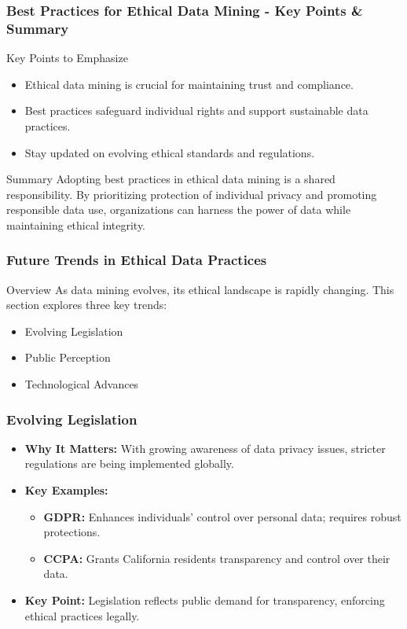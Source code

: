 \documentclass[aspectratio=169]{beamer}
\begin{document}
\begin{frame}[fragile]
    \frametitle{Best Practices for Ethical Data Mining - Key Points & Summary}
    \begin{block}{Key Points to Emphasize}
        \begin{itemize}
            \item Ethical data mining is crucial for maintaining trust and compliance.
            \item Best practices safeguard individual rights and support sustainable data practices.
            \item Stay updated on evolving ethical standards and regulations.
        \end{itemize}
    \end{block}

    \vspace{0.5cm}
    
    \begin{block}{Summary}
        Adopting best practices in ethical data mining is a shared responsibility. By prioritizing protection of individual privacy and promoting responsible data use, organizations can harness the power of data while maintaining ethical integrity.
    \end{block}
\end{frame}

\begin{frame}[fragile]
    \frametitle{Future Trends in Ethical Data Practices}
    \begin{block}{Overview}
        As data mining evolves, its ethical landscape is rapidly changing. This section explores three key trends:
        \begin{itemize}
            \item Evolving Legislation
            \item Public Perception
            \item Technological Advances
        \end{itemize}
    \end{block}
\end{frame}

\begin{frame}[fragile]
    \frametitle{Evolving Legislation}
    \begin{itemize}
        \item \textbf{Why It Matters:} With growing awareness of data privacy issues, stricter regulations are being implemented globally.
        \item \textbf{Key Examples:}
        \begin{itemize}
            \item \textbf{GDPR:} Enhances individuals’ control over personal data; requires robust protections.
            \item \textbf{CCPA:} Grants California residents transparency and control over their data.
        \end{itemize}
        \item \textbf{Key Point:} Legislation reflects public demand for transparency, enforcing ethical practices legally.
    \end{itemize}
\end{frame}
\end{document}
